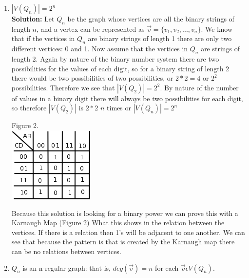 \documentclass[10pt,a4paper]{report}
\begin{document}
	\begin{enumerate}
		\item $|V(Q_n)| = 2^n$\\
		\textbf{Solution: }Let $Q_{n}$ be the graph whose vertices are all the binary strings of length $n$, and a vertex can be represented as $\vec{v} = \{v_{1}, v_{2}, ..., v_{n}\}$.  We know that if the vertices in $Q_{n}$ are binary strings of length 1 there are only two different vertices: 0 and 1.  Now assume that the vertices in $Q_{n}$ are strings of length 2.  Again by nature of the binary number system there are two possibilities for the values of each digit, so for a binary string of length 2 there would be two possibilities of two possibilities, or $2*2=4$ or $2^{2}$ possibilities.  Therefore we see that $|V(Q_{2})| = 2^{2}$. By nature of the number of values in a binary digit there will always be two possibilities for each digit, so therefore $|V(Q_{2})|$ is $2 * 2$ $n$ times or $|V(Q_{n})|=2^{n}$\\
		\newline			
		\begin{center}
			Figure 2.\\
			\includegraphics[scale=.5]{2_1.png}
		\end{center}
		
		Because this solution is looking for a binary power we can prove this with a Karnaugh Map (Figure 2) What this shows in the relation between the vertices.  If there is a relation then 1's will be adjacent to one another.  We can see that because the pattern is that is created by the Karnaugh map there can be no relations between vertices.\\
		\pagebreak
		\newline
		\item $Q_n$ is an n-regular graph: that is, $deg (\vec{v}) = n $ for each $\vec{v} \epsilon V(Q_n)$.
		

\end{enumerate}
\end{document}
